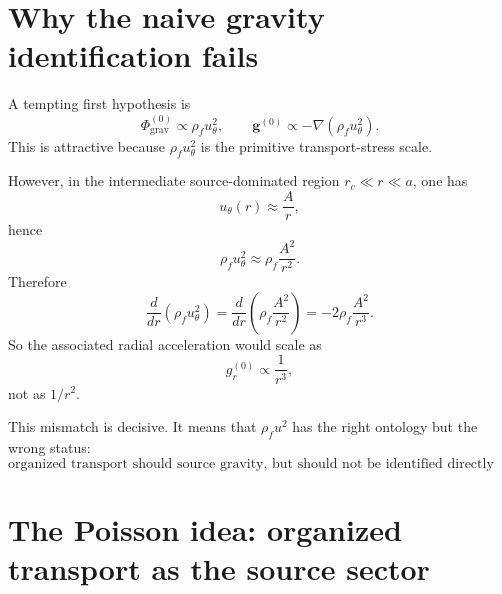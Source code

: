 \documentclass[11pt]{article}
\newcommand{\rhoF}{\rho_{\!f}}
\newcommand{\rc}{{r_c}}
\newcommand{\grav}{\mathrm{grav}}
\begin{document}
        \section{Why the naive gravity identification fails}
        
        A tempting first hypothesis is
        \begin{equation}
            \Phi_{\grav}^{(0)} \propto \rhoF u_\theta^2,
            \qquad
            \mathbf{g}^{(0)} \propto -\nabla\!\left(\rhoF u_\theta^2\right).
            \label{eq:naive-hypothesis}
        \end{equation}
        This is attractive because \(\rhoF u_\theta^2\) is the primitive transport-stress scale.
        
        However, in the intermediate source-dominated region \(\rc \ll r \ll a\), one has
        \begin{equation}
            u_\theta(r)\approx \frac{A}{r},
            \label{eq:u-mid}
        \end{equation}
        hence
        \begin{equation}
            \rhoF u_\theta^2 \approx \rhoF \frac{A^2}{r^2}.
            \label{eq:rho-u2-mid}
        \end{equation}
        Therefore
        \begin{equation}
            \frac{d}{dr}\left(\rhoF u_\theta^2\right)
            =
            \frac{d}{dr}\left(\rhoF \frac{A^2}{r^2}\right)
            =
            -2\rhoF \frac{A^2}{r^3}.
            \label{eq:dr-rhou2}
        \end{equation}
        So the associated radial acceleration would scale as
        \begin{equation}
            g_r^{(0)} \propto \frac{1}{r^3},
            \label{eq:g-r3}
        \end{equation}
        not as \(1/r^2\).
        
        This mismatch is decisive. It means that \(\rhoF u^2\) has the right ontology but the wrong status:
        \begin{equation}
            \boxed{
                \text{organized transport should source gravity, but should not be identified directly with the gravity field.}
            }
            \label{eq:source-not-field}
        \end{equation}
        
        \section{The Poisson idea: organized transport as the source sector}
        
\end{document}

